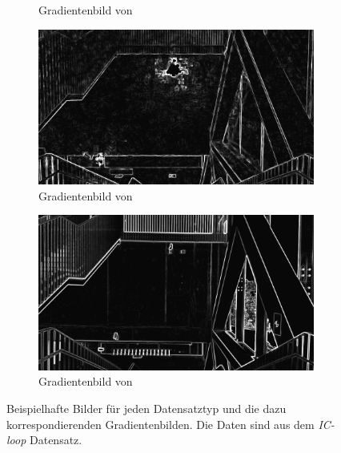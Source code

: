 \begin{figure}
\begin{subfigure}[t]{0.24\linewidth}
		\caption{Gradientenbild  \hspace{1cm} von }
	\end{subfigure}
	\hfill
	\begin{subfigure}[t]{0.24\linewidth}
		\centering
		\includegraphics[width=\linewidth]{images/syn_dataset/cg00188.png}
		\caption{Gradientenbild  \hspace{1cm} von }
	\end{subfigure}
	\hfill
	\begin{subfigure}[t]{0.24\linewidth}
		\centering
		\includegraphics[width=\linewidth]{images/syn_dataset/rg000089.png}
		\caption{Gradientenbild  \hspace{1cm} von }
	\end{subfigure}
	\hfill
	\caption{Beispielhafte Bilder für jeden Datensatztyp und die dazu korrespondierenden Gradientenbilden. Die Daten sind aus dem \textit{IC-loop} Datensatz.}
	\label{fig:dataset_preprocess}
\end{figure}

\cleardoublepage



